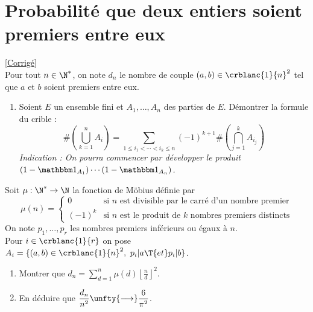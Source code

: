 \documentclass[8pt]{book}
\begin{document}
\section{Probabilité que deux entiers soient premiers entre eux }
\label{Probabilité que deux entiers soient premiers entre eux}
\textcolor{blue}{\hyperref[Probabilité que deux entiers soient premiers entre eux corrigé]{[Corrigé]}}\\
Pour tout $n\in \N^*$, on note $d_n$ le nombre de couple $(a,b)\in \crblanc{1}{n}^2$ tel que $a$ et $b$ soient premiers entre eux.
\begin{enumerate}
	\item Soient $E$ un ensemble fini et $A_1,\dots,A_n$ des parties de $E$. Démontrer la formule du crible :
	$$\#\left(\bigcup_{k=1}^nA_i\right)=\sum_{1\leq i_1<\cdots<i_k\leq n}(-1)^{k+1}\#\left(\bigcap_{j=1}^kA_{i_j}\right)$$
	\textit{Indication : On pourra commencer par développer le produit $(1-\mathbbm 1_{A_1})\cdots(1-\mathbbm 1_{A_n})$.}
\end{enumerate}
Soit $\mu:\N^*\to \N$ la fonction de Möbius définie par $$\mu(n)=\begin{cases}
	0&\mbox{si }n\mbox{ est divisible par le carré d'un nombre premier}\\
	(-1)^k&\mbox{si }n\mbox{ est le produit de }k\mbox{ nombres premiers distincts}
\end{cases}$$
On note $p_1,\dots,p_r$ les nombres premiers inférieurs ou égaux à $n$.\\
Pour $i\in \crblanc{1}{r}$ on pose $A_i=\{(a,b)\in \crblanc{1}{n}^2,\ p_i|a\T{ et }p_i|b\}$.
\begin{enumerate}[resume]
	\item Montrer que $d_n=\displaystyle{\sum\limits_{d=1}^{n}{\mu(d)\left\lfloor \frac{n}{d}\right\rfloor^2}}$.
	\item En déduire que $\displaystyle{\frac{d_n}{n^2} \unfty{\longrightarrow} \frac{6}{\pi^2}}$.
\end{enumerate}
\end{document}
